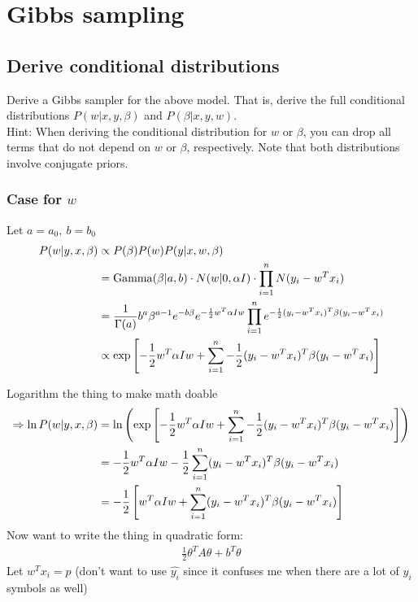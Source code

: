 \documentclass[12pt]{article}
\begin{document}
\section{Gibbs sampling}
    \subsection{Derive conditional distributions}
        \begin{tcolorbox}
            Derive a Gibbs sampler for the above model. That is, derive the full conditional distributions $P(w|x,y,\beta)$ and $P(\beta|x,y,w).$\\
            Hint: When deriving the conditional distribution for $w$ or $\beta$, you can drop all terms that do not depend on $w$ or $\beta$, respectively. Note that both distributions involve conjugate priors.  
        \end{tcolorbox}
        \newcommand{\mvnexpol}[2]{e^{-{\frac{1}{2}} #1^T #2 #1}}
        \newcommand{\opGamma}[0]{\operatorname{Gamma}}

        \subsubsection*{Case for $w$}
            Let $a=a_0,\ b=b_0$
            \begin{align}
                P(w|y, x, \beta) &\propto P(\beta) P(w) P(y|x,w,\beta)\\
                &= \opGamma(\beta|a, b) \cdot N(w|0,\alpha I) \cdot \prodlim{1}{n} N(y_i - w^T x_i) \\
                &= \frac{1}{\Gamma(a)}b^{a}\beta^{a-1}e^{-b\beta}\mvnexpol{w}{\alpha I} \prodlim{1}{n} \mvnexpol{(y_i - w^T x_i)}{\beta} \\ 
                &\propto \exp\enclb{-\frac{1}{2}w^T\alpha Iw + \sumlim{1}{n}-\frac{1}{2}(y_i-w^Tx_i)^T\beta(y_i-w^Tx_i)}
            \end{align}

            Logarithm the thing to make math doable
            \begin{align}
                \Rightarrow \ln P(w|y, x, \beta) &= \ln \left(\exp\left[-\frac{1}{2}w^T\alpha Iw + \sum\limits_{i=1}^{n}-\frac{1}{2}(y_i-w^Tx_i)^T\beta(y_i-w^Tx_i)\right]\right) \\ 
                &= -\frac{1}{2} w^T \alpha I w -\frac{1}{2} \sum\limits_{i=1}^{n} (y_i - w^T x_i)^T \beta (y_i - w^T x_i) \\ 
                &= -\frac{1}{2} \left[ w^T \alpha I w + \sum\limits_{i=1}^{n} (y_i - w^T x_i)^T \beta (y_i - w^T x_i) \right] 
            \end{align}
            Now want to write the thing in quadratic form:
            \begin{align}
                \frac{1}{2} \theta^T A \theta + b^T \theta
            \end{align}
            Let $w^T x_i = p$ (don't want to use $\hat{y_i}$ since it confuses me when there are a lot of $y_i$ symbols as well)
\end{document}
